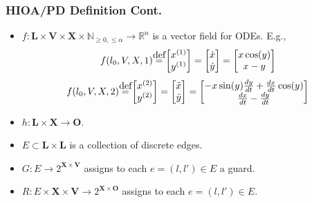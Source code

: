 \begin{frame}[c] \frametitle{ HIOA/PD Definition Cont. }
	\vspace{-5pt}
	\begin{block}{}
		\begin{itemize}
		
		\item $f : \mathbf{L} \times \mathbf{V} \times \mathbf{X} \times \mathbb{N}_{\geq 0,\leq \alpha} \rightarrow \mathbb{R}^{n}$ is a vector field for ODEs. E.g., 
		\begin{equation}
			f(l_0, V, X, 1) \myeq 
			\begin{bmatrix} 
				x^{(1)} \\
				y^{(1)} 
			\end{bmatrix}
			= 
			\begin{bmatrix} 
				\dot{x} \\
				\dot{y} 
			\end{bmatrix}
			=
			\begin{bmatrix}
				x \cos (y) \\
				x - y
			\end{bmatrix}
		\end{equation}
		\begin{equation}
			f(l_0, V, X, 2) \myeq 
			\begin{bmatrix} 
				x^{(2)} \\
				y^{(2)} 
			\end{bmatrix}
			= 
			\begin{bmatrix} 
				\ddot{x} \\
				\ddot{y} 
			\end{bmatrix}
			=
			\begin{bmatrix}
				-x \sin (y) \frac{dy}{dt} + \frac{dx}{dt} \cos (y) \\
				\frac{dx}{dt} - \frac{dy}{dt}
			\end{bmatrix}
		\end{equation}
		\item $h : \mathbf{L} \times \mathbf{X} \rightarrow \mathbf{O}$.
		\item $E \subset \mathbf{L} \times \mathbf{L} $ is a collection of discrete edges.
		\item $G : E \rightarrow 2^{\mathbf{X} \times \mathbf{V}}$ assigns to each
		  $e = (l, l') \in E$ a guard.
		\item
		  $R : E \times \mathbf{X} \times \mathbf{V} \rightarrow 2^{\mathbf{X} \times \mathbf{O}}$
		  assigns to each $e = (l,l') \in E$.
		\end{itemize}
	\end{block}
\end{frame}





